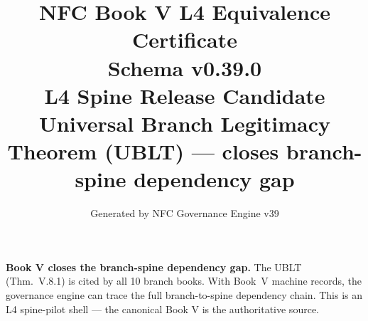\documentclass[11pt]{article}
\title{NFC Book V L4 Equivalence Certificate\\[1ex]\large Schema v0.39.0\\[0.5ex]
\normalsize L4 Spine Release Candidate\\[0.5ex]
\small Universal Branch Legitimacy Theorem (UBLT) --- closes branch-spine dependency gap}
\author{Generated by NFC Governance Engine v39}
\date{}
\begin{document}
\maketitle
\tableofcontents
\bigskip
\noindent\textbf{Book V closes the branch-spine dependency gap.} The UBLT (Thm.~V.8.1) is
cited by all 10 branch books. With Book~V machine records, the governance engine
can trace the full branch-to-spine dependency chain.
This is an L4 spine-pilot shell --- the canonical Book V is the authoritative source.
\vspace{1em}

\end{document}
